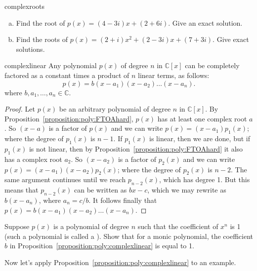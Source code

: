 \begin{exercise}{complexroots}
\begin {enumerate}[(a)]
\item
Find the root of $p(x)=(4-3i)x+(2+6i)$. Give an exact solution.
\item
Find the roots of $p(x)=(2+i)x^2+(2-3i)x+(7+3i)$. Give exact solutions. 
\end{enumerate}
\end{exercise}

\begin{prop}{complexlinear}
Any polynomial $p(x)$  of degree $n$ in $\mathbb{C}[x]$ can be completely factored as a constant times a product of $n$ linear terms,   as follows:
\begin{equation}
p(x) = b(x -a_1)(x-a_2) \ldots (x - a_n).
\end{equation}
where $b, a_1, \ldots, a_n \in {\mathbb C}$.
\end{prop}

\begin{proof}{} 
Let $p(x)$ be an arbitrary polynomial of degree $n$ in $\mathbb{C}[x]$. By Proposition~\ref{proposition:poly:FTOAhard}, $p(x)$ has at least one complex root $a$. So $(x-a)$ is a factor of $p(x)$ and we can write $p(x)=(x-a_1)p_1(x)$; where the degree of $p_1(x)$ is $n-1$. If $p_1(x)$ is linear, then we are done, but if $p_1(x)$ is not linear, then by Proposition~\ref{proposition:poly:FTOAhard} it also has a complex root $a_2$. So $(x-a_2)$ is a factor of $p_2(x)$ and we can write $p(x)=(x-a_1)(x-a_2)p_2(x)$; where the degree of $p_2(x)$ is $n-2$. The same argument continues until we reach $p_{n-2}(x)$, which has degree 1. But this means that $p_{n-2}(x)$ can be written as $bx - c$, which we may rewrite as $b(x-a_n)$, where $a_n = c/b$.  It follows finally that $p(x) =b (x-a_1)(x-a_2) \ldots (x-a_n) $.
\end{proof}

\begin{exercise}{}
Suppose $p(x)$ is a polynomial of degree $n$ such that the coefficient of $x^n$ is 1 (such a polynomial is called a ). Show that for a monic polynomial, the coefficient $b$ in 
Proposition~\ref{proposition:poly:complexlinear} is equal to 1.
\end{exercise}

Now let's apply Proposition~\ref{proposition:poly:complexlinear} to an example.


